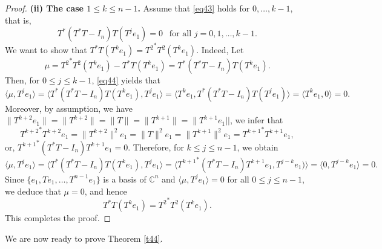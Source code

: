 \documentclass[11pt]{article}
\numberwithin{equation}{section}
\def\IC{{\mathbb C}}
\begin{document}
\begin{proof}
\medskip
\noindent
\textbf{(ii) The case $1\le k\le n-1$.}
Assume that \eqref{eq43} holds for $0,\ldots,k-1$, that is,
\begin{equation}\label{eq44}
T^*(T^*T-I_n)T(T^je_1)=0 \ \ \mbox{ for all } j=0,1,\ldots,k-1.
\end{equation}
We want to show that $T^*T(T^k e_1) = {T^2}^*T^{2}(T^k e_1)$. Indeed, Let
$$\mu={T^2}^*T^2(T^k e_1)-T^*T(T^k e_1) = T^*(T^*T-I_n)T(T^ke_1).$$ Then, for $0\le j\le k-1$, \eqref{eq44} yields that
$$\langle \mu, T^je_1\rangle= \langle  T^*(T^*T-I_n)T(T^ke_1), T^je_1\rangle= \langle T^ke_1,  T^*(T^*T-I_n)T(T^je_1)\rangle= \langle T^ke_1, 0\rangle=0.$$
Moreover, by assumption, we have $\|T^{k+2}e_1\|=\|T^{k+2}\|=\|T\|=\|T^{k+1}\|=\|T^{k+1}e_1||$, we infer that
$${T^{k+2}}^*T^{k+2}e_1=\|T^{k+2}\|^2e_1=\|T\|^2e_1=\|T^{k+1}\|^2e_1={T^{k+1}}^*T^{k+1}e_1,$$
or, ${T^{k+1}}^*(T^*T-I_n)T^{k+1}e_1=0$. Therefore, for $k\le j\le n-1$, we obtain
$$\langle \mu, T^je_1\rangle= \langle  T^*(T^*T-I_n)T(T^ke_1), T^je_1\rangle= \langle {T^{k+1}}^*(T^*T-I_n)T^{k+1}e_1, T^{j-k}e_1)\rangle= \langle 0, T^{j-k}e_1 \rangle=0.$$
Since $\{e_1, Te_1, \dots, T^{n-1}e_1\}$ is a basis of $\IC^n$ and $\langle \mu, T^je_1\rangle=0$ for all $0\le j\le n-1$,
we deduce that $\mu=0$, and hence
\[
T^*T (T^k e_1) = {T^2}^*T^2 (T^k e_1).
\]
This completes the proof.
\end{proof}

We are now ready to prove Theorem \ref{t44}.
\end{document}

